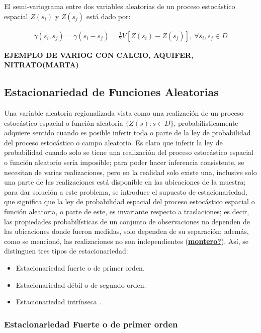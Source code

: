 \documentclass[
]{book}
\providecommand{\tightlist}{%
  \setlength{\itemsep}{0pt}\setlength{\parskip}{0pt}}
\begin{document}
El semi-variograma entre dos variables aleatorias de un proceso estocástico espacial \(Z(s_i)\) y \(Z(s_j)\) está dado por:

\begin{align}
  \gamma(s_i,s_j)=\gamma(s_i-s_j)= \frac{1}{2} V[Z(s_i)-Z(s_j)], \ \forall s_i,s_j \in D 
\end{align}

\textbf{EJEMPLO DE VARIOG CON CALCIO, AQUIFER, NITRATO(MARTA)}

\hypertarget{estacionariedad-de-funciones-aleatorias}{%
\subsection{Estacionariedad de Funciones Aleatorias}\label{estacionariedad-de-funciones-aleatorias}}

Una variable aleatoria regionalizada vista como una realización de un proceso estocástico espacial o función aleatoria \(\{Z(s):s\in D\}\), probabilísticamente adquiere sentido cuando es posible inferir toda o parte de la ley de probabilidad del proceso estocástico o campo aleatorio. Es claro que inferir la ley de probabilidad cuando solo se tiene una realización del proceso estocástico espacial o función aleatorio sería imposible; para poder hacer inferencia consistente, se necesitan de varias realizaciones, pero en la realidad solo existe una, inclusive solo una parte de las realizaciones está disponible en las ubicaciones de la muestra; para dar solución a este problema, se introduce el supuesto de estacionariedad, que significa que la ley de probabilidad espacial del proceso estocástico espacial o función aleatoria, o parte de este, es invariante respecto a traslaciones; es decir, las propiedades probabilísticas de un conjunto de observaciones no dependen de las ubicaciones donde fueron medidas, solo dependen de su separación; además, como se mencionó, las realizaciones no son independientes (\protect\hyperlink{ref-montero}{\textbf{montero?}}). Así, se distinguen tres tipos de estacionariedad:

\begin{itemize}
\tightlist
\item
  Estacionariedad fuerte o de primer orden.
\item
  Estacionariedad débil o de segundo orden.
\item
  Estacionariedad intrínseca .
\end{itemize}

\hypertarget{estacionariedad-fuerte-o-de-primer-orden}{%
\subsubsection*{Estacionariedad Fuerte o de primer orden}\label{estacionariedad-fuerte-o-de-primer-orden}}
\end{document}
